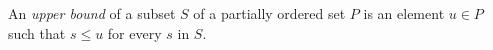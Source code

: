 An \textit{upper bound} of a subset $S$ of a partially ordered set $P$ is an element $u \in P$ such that $s \leq u$ for every $s$ in $S$.
